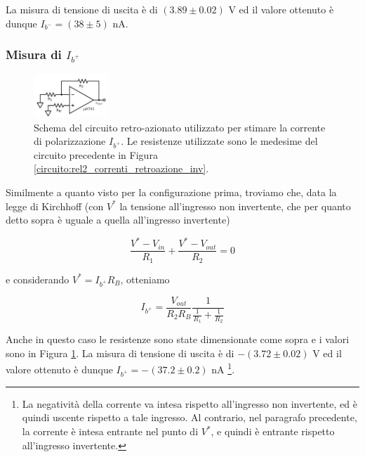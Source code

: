 La misura di tensione di uscita è di $(3.89\pm0.02)$ \si{\volt} ed il valore ottenuto è dunque $I_{b^-} = (38 \pm 5)$ \si{\nano\ampere}.

\subsubsection*{Misura di $I_{b^+}$}

\begin{figure}
  \begin{center}
    \includegraphics[width=0.25\textwidth]{../E02/latex/ninv_current.pdf}
  \end{center}
  \caption{Schema del circuito retro-azionato utilizzato per stimare la corrente di polarizzazione $I_{b^+}$. Le resistenze utilizzate sono le medesime del circuito precedente in Figura \ref{circuito:rel2_correnti_retroazione_inv}.}
  \label{circuito:rel2_correnti_retroazione_noninv}
\end{figure}

Similmente a quanto visto per la configurazione prima, troviamo che, data la legge di Kirchhoff (con $V^*$ la tensione all'ingresso non invertente, che per quanto detto sopra è uguale a quella all'ingresso invertente)

$$\frac{V^* - V_{in}}{R_1} + \frac{V^*-V_{out}}{R_2}=0$$

e considerando $V^*=I_{b^+} R_B$, otteniamo

\begin{equation}
I_{b^+}=\frac{V_{out}}{R_2 R_B}\frac{1}{\frac{1}{R_1}+\frac{1}{R_2}}
\label{eq2:corrente_noninv}
\end{equation}

Anche in questo caso le resistenze sono state dimensionate come sopra e i valori sono in Figura \ref{circuito:rel2_correnti_retroazione_noninv}. La misura di tensione di uscita è di $-(3.72 \pm 0.02)$   \si{\volt} ed il valore ottenuto è dunque $I_{b^+} = - (37.2 \pm 0.2)$ \si{\nano\ampere} \footnote{La negatività della corrente va intesa rispetto all'ingresso non invertente, ed è quindi uscente rispetto a tale ingresso. Al contrario, nel paragrafo precedente, la corrente è intesa entrante nel punto di $V^*$, e quindi è entrante rispetto all'ingresso invertente.}.

